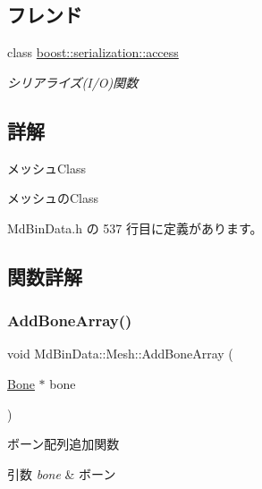 \subsection*{フレンド}
\begin{DoxyCompactItemize}
\item 
class \mbox{\hyperlink{class_md_bin_data_1_1_mesh_ac98d07dd8f7b70e16ccb9a01abf56b9c}{boost\+::serialization\+::access}}
\begin{DoxyCompactList}\small\item\em シリアライズ(I/O)関数 \end{DoxyCompactList}\end{DoxyCompactItemize}


\subsection{詳解}
メッシュ\+Class 

メッシュの\+Class 

 Md\+Bin\+Data.\+h の 537 行目に定義があります。



\subsection{関数詳解}
\mbox{\label{class_md_bin_data_1_1_mesh_af6c2e5fd653aff7a746c8c913b5175e7}} 
\subsubsection{\texorpdfstring{Add\+Bone\+Array()}{AddBoneArray()}}
{\footnotesize\ttfamily void Md\+Bin\+Data\+::\+Mesh\+::\+Add\+Bone\+Array (\begin{DoxyParamCaption}\item[{\mbox{\hyperlink{class_md_bin_data_1_1_mesh_1_1_bone}{Bone}} $\ast$}]{bone }\end{DoxyParamCaption})}



ボーン配列追加関数 


\begin{DoxyParams}{引数}
{\em bone} & ボーン \\
\hline
\end{DoxyParams}

